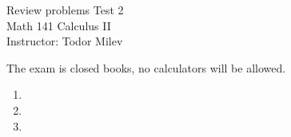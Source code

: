 \documentclass{article}
\begin{document}
\begin{center}
\Large
Review problems Test 2\\ Math 141 Calculus II \\ \normalsize Instructor: Todor Milev
\end{center}


\noindent The exam is closed books, no calculators will be allowed. 

\begin{enumerate}
\item 
\item 
\item 



\end{enumerate}
\end{document}
